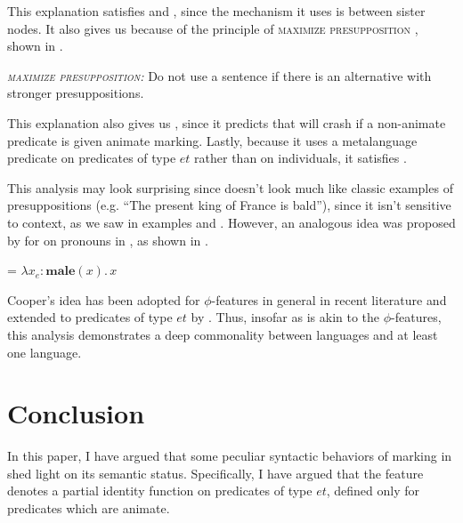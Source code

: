\documentclass[output=paper,newtxmath,modfonts,nonflat,hidelinks]{langsci/langscibook}
\begin{document}
This explanation satisfies  and , since the mechanism it uses is  between sister nodes.  It also gives us  because of the principle of \textsc{maximize presupposition} \citep{heim91}, shown in .

\ea\label{ex:pesetsky:maximize} \textit{\textsc{maximize presupposition}:} Do not use a sentence if there is an alternative with stronger presuppositions. \z

This explanation also gives us , since it predicts that  will crash if a non-animate predicate is given animate marking.  Lastly, because it uses a metalanguage predicate on predicates of type $et$ rather than on individuals, it satisfies .

This analysis may look surprising since  doesn't look much like classic examples of presuppositions (e.g. ``The present king of France is bald''), since it isn't sensitive to context, as we saw in examples  and . However, an analogous idea was proposed by \citet{cooper83} for  on pronouns in , as shown in .

\ea\label{ex:pesetsky:cooper}  = $\lambda x_e : \textbf{male}(x). \, x$ \z

Cooper's idea has been adopted for $\phi$-features in general in recent literature \citep{hnk91, sauerland08, heim08} and extended to predicates of type $et$ by \citet{merchant14}. Thus, insofar as  is akin to the $\phi$-features, this analysis demonstrates a deep commonality between  languages and at least one  language.

 \section{Conclusion} \label{sec:pesetsky:concludesection}

In this paper, I have argued that some peculiar syntactic behaviors of  marking in  shed light on its semantic status.  Specifically, I have argued that the  feature denotes a partial identity function on predicates of type $et$, defined only for predicates which are animate. 
\end{document}

